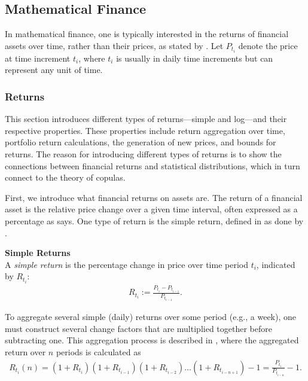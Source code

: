 
\subsection{Mathematical Finance}\label{sec:MathematicalFinance}
In mathematical finance, one is typically interested in the returns of financial assets over time, rather than their prices, as stated by . Let $P_{t_i}$ denote the price at time increment $t_i$, where $t_i$ is usually in daily time increments but can represent any unit of time. 

\subsubsection{Returns}
This section introduces different types of returns—simple and log—and their respective properties. These properties include return aggregation over time, portfolio return calculations, the generation of new prices, and bounds for returns. The reason for introducing different types of returns is to show the connections between financial returns and statistical distributions, which in turn connect to the theory of copulas. 

First, we introduce what financial returns on assets are. The return of a financial asset is the relative price change over a given time interval, often expressed as a percentage as  says. One type of return is the simple return, defined in  as done by .

\begin{definition}\label{def:simpleReturns}
    \textbf{Simple Returns} \\
    A \emph{simple return} is the percentage change in price over time period $t_i$, indicated by $R_{t_i}$:
    \begin{align*}
        R_{t_i} := \frac{P_{t_i}-P_{t_{i-1}}}{P_{t_{i-1}}}.
    \end{align*}
\end{definition}

To aggregate several simple (daily) returns over some period (e.g., a week), one must construct several change factors that are multiplied together before subtracting one. This aggregation process is described in , where the aggregated return over $n$ periods is calculated as
\begin{align*}
    R_{t_{i}}(n) = (1+R_{t_{i}})(1+R_{t_{i-1}})(1+R_{t_{i-2}})\dots (1+R_{t_{i-n+1}}) -1 = \frac{P_{t_{i}}}{P_{t_{i-n}}}-1.
\end{align*}

